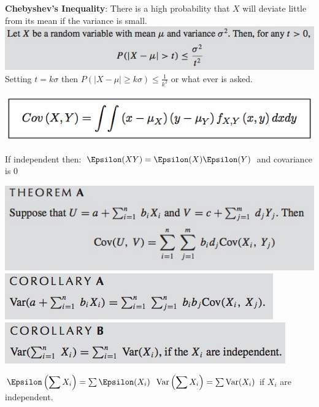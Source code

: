 \documentclass{/out/app/latex/examnotes}
\begin{document}
{\vspace{6pt}
{\bf Chebyshev's Inequality}: There is a high probability that $X$ will deviate little from its mean if the variance is small.
\vspace{6pt}
\includegraphics[scale=0.5]{./img/421.jpg}
Setting $t=k\sigma$ then $P(|X-\mu|\ge k\sigma)\le \displaystyle\frac{1}{k^2}$ or what ever is asked.

\disobeylines
{} %
\obeylines
\includegraphics[scale=0.5]{./img/43.jpg}

If independent then: $ \E(XY)=\E(X)\E(Y)$ and covariance is $0$

\includegraphics[scale=0.5]{./img/431.jpg}
\includegraphics[scale=0.5]{./img/432.jpg}\includegraphics[scale=0.5]{./img/433.jpg}

\disobeylines
{} %

\obeylines
$\E\left(\displaystyle\sum X_i\right)=\sum \E(X_i)$
\vspace{6pt}
$\mathrm{Var}\left(\displaystyle\sum X_i\right)=\sum \mathrm{Var}(X_i)$ if $X_i$ are independent.

}
\end{document}
